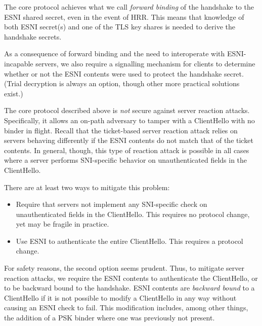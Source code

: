 \documentclass{article}
\theoremstyle{definition}
\begin{document}
\noindent{}

The core protocol achieves what we call \emph{forward binding} of the handshake to the ESNI 
shared secret, even in the event of HRR. This means that knowledge of both ESNI secret(s) 
and one of the TLS key shares is needed to derive the handshake secrets. 

As a consequence of forward binding and the need to interoperate with ESNI-incapable servers, 
we also require a signalling mechanism for clients to determine whether or not the ESNI contents were 
used to protect the handshake secret. (Trial decryption is always an option, though other more practical 
solutions exist.)

The core protocol described above is \emph{not} secure against server reaction attacks.
Specifically, it allows an on-path adversary to tamper with a ClientHello with no
binder in flight. Recall that the ticket-based server reaction attack relies on servers
behaving differently if the ESNI contents do not match that of the ticket contents.
In general, though, this type of reaction attack is possible in all cases where a server
performs SNI-specific behavior on unauthenticated fields in the ClientHello. 

There are at least two ways to mitigate this problem:
%
\begin{itemize}
  \item Require that servers not implement any SNI-specific check on unauthenticated fields
  in the ClientHello. This requires no protocol change, yet may be fragile in practice.
  \item Use ESNI to authenticate the entire ClientHello. This requires a protocol change.
\end{itemize}
%

For safety reasons, the second option seems prudent. Thus, to mitigate server reaction attacks,
we require the ESNI contents to authenticate the ClientHello, or to be backward bound to the 
handshake. ESNI contents are \emph{backward bound} to a ClientHello if it is not possible 
to modify a ClientHello in any way without causing an ESNI check to fail. This modification includes,
among other things, the addition of a PSK binder where one was previously not present.
\end{document}
